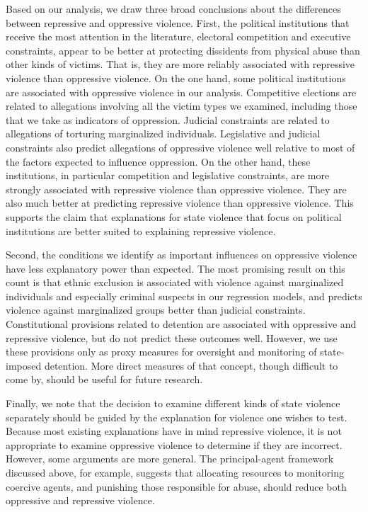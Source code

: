 \documentclass[11pt]{article}
\begin{document}
Based on our analysis, we draw three broad conclusions about the differences between repressive and oppressive violence. First, the political institutions that receive the most attention in the literature, electoral competition and executive constraints, appear to be better at protecting dissidents from physical abuse than other kinds of victims. That is, they are more reliably associated with repressive violence than oppressive violence. On the one hand, some political institutions are associated with oppressive violence in our analysis. Competitive elections are related to allegations involving all the victim types we examined, including those that we take as indicators of oppression. Judicial constraints are related to allegations of torturing marginalized individuals. Legislative and judicial constraints also predict allegations of oppressive violence well relative to most of the factors expected to influence oppression. On the other hand, these institutions, in particular competition and legislative constraints, are more strongly associated with repressive violence than oppressive violence. They are also much better at predicting repressive violence than oppressive violence. This supports the claim that explanations for state violence that focus on political institutions are better suited to explaining repressive violence. 

Second, the conditions we identify as important influences on oppressive violence have less explanatory power than expected. The most promising result on this count is that ethnic exclusion is associated with violence against marginalized individuals and especially criminal suspects in our regression models, and predicts violence against marginalized groups better than judicial constraints. Constitutional provisions related to detention are associated with oppressive and repressive violence, but do not predict these outcomes well. However, we use these provisions only as proxy measures for oversight and monitoring of state-imposed detention. More direct measures of that concept, though difficult to come by, should be useful for future research.     

Finally, we note that the decision to examine different kinds of state violence separately should be guided by the explanation for violence one wishes to test. Because most existing explanations have in mind repressive violence, it is not appropriate to examine oppressive violence to determine if they are incorrect. However, some arguments are more general. The principal-agent framework discussed above, for example, suggests that allocating resources to monitoring coercive agents, and punishing those responsible for abuse, should reduce both oppressive and repressive violence.   
\end{document}

